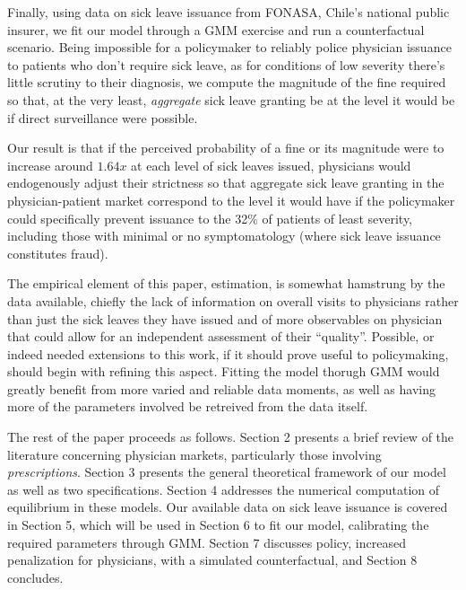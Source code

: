 \documentclass[../main.tex]{subfiles}
\begin{document}
Finally, using data on sick leave issuance from FONASA, Chile's national public insurer, we fit our model through a GMM exercise and run a counterfactual scenario. Being impossible for a policymaker to reliably police physician issuance to patients who don't require sick leave, as for conditions of low severity there's little scrutiny to their diagnosis, we compute the magnitude of the fine required so that, at the very least, \textit{aggregate} sick leave granting be at the level it would be if direct surveillance were possible.

Our result is that if the perceived probability of a fine or its magnitude were to increase around $1.64x$ at each level of sick leaves issued, physicians would endogenously adjust their strictness so that aggregate sick leave granting in the physician-patient market correspond to the level it would have if the policymaker could specifically prevent issuance to the 32\% of patients of least severity, including those with minimal or no symptomatology (where sick leave issuance constitutes fraud).

The empirical element of this paper, estimation, is somewhat hamstrung by the data available, chiefly the lack of information on overall visits to physicians rather than just the sick leaves they have issued and of more observables on physician that could allow for an independent assessment of their ``quality''. Possible, or indeed needed extensions to this work, if it should prove useful to policymaking, should begin with refining this aspect. Fitting the model thorugh GMM would greatly benefit from more varied and reliable data moments, as well as having more of the parameters involved be retreived from the data itself.

The rest of the paper proceeds as follows. Section 2 presents a brief review of the literature concerning physician markets, particularly those involving \textit{prescriptions}. Section 3 presents the general theoretical framework of our model as well as two specifications. Section 4 addresses the numerical computation of equilibrium in these models. Our available data on sick leave issuance is covered in Section 5, which will be used in Section 6 to fit our model, calibrating the required parameters through GMM. Section 7 discusses policy, increased penalization for physicians, with a simulated counterfactual, and Section 8 concludes.
\end{document}
